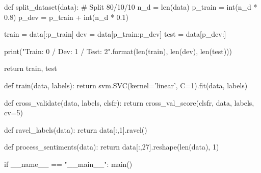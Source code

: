 \documentclass{article} %
\begin{document}
\begin{python}
def split_dataset(data):
  # Split 80/10/10
  n_d = len(data)
  p_train = int(n_d * 0.8)
  p_dev = p_train + int(n_d * 0.1)

  train = data[:p_train]
  dev = data[p_train:p_dev]
  test = data[p_dev:]

  print("Train: {0} / Dev: {1} / Test: {2}".format(len(train), len(dev), len(test)))

  return train, test

def train(data, labels):
  return svm.SVC(kernel='linear', C=1).fit(data, labels)

def cross_validate(data, labels, clsfr):
  return cross_val_score(clsfr, data, labels, cv=5)

def ravel_labels(data):
  return data[:,1].ravel()

def process_sentiments(data):
  return data[:,27].reshape(len(data), 1)

if __name__ == "__main__":
  main()
\end{python}
\end{document}

